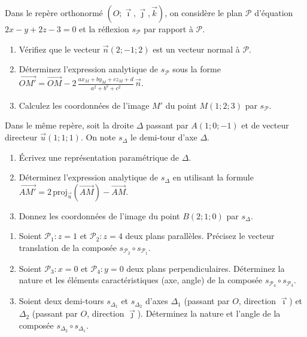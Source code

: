 \documentclass[11pt]{article}
\begin{document}
\begin{exercice}
Dans le repère orthonormé $(O;\vec{\imath},\vec{\jmath},\vec{k})$, on considère le plan $\mathcal{P}$ d'équation $2x - y + 2z - 3 = 0$ et la réflexion $s_{\mathcal{P}}$ par rapport à $\mathcal{P}$.
\begin{enumerate}
    \item Vérifiez que le vecteur $\vec{n}(2;-1;2)$ est un vecteur normal à $\mathcal{P}$.
    \item Déterminez l'expression analytique de $s_{\mathcal{P}}$ sous la forme $\overrightarrow{OM'} = \overrightarrow{OM} - 2\,\frac{ax_M+by_M+cz_M+d}{a^2+b^2+c^2}\,\vec{n}$.
    \item Calculez les coordonnées de l'image $M'$ du point $M(1;2;3)$ par $s_{\mathcal{P}}$.
\end{enumerate}
\end{exercice}

\begin{exercice}
Dans le même repère, soit la droite $\Delta$ passant par $A(1;0;-1)$ et de vecteur directeur $\vec{u}(1;1;1)$. On note $s_{\Delta}$ le demi-tour d'axe $\Delta$.
\begin{enumerate}
    \item Écrivez une représentation paramétrique de $\Delta$.
    \item Déterminez l'expression analytique de $s_{\Delta}$ en utilisant la formule $\overrightarrow{AM'} = 2\,\text{proj}_{\vec{u}}(\overrightarrow{AM}) - \overrightarrow{AM}$.
    \item Donnez les coordonnées de l'image du point $B(2;1;0)$ par $s_{\Delta}$.
\end{enumerate}
\end{exercice}

\begin{exercice}
\begin{enumerate}
    \item Soient $\mathcal{P}_1 : z=1$ et $\mathcal{P}_2 : z=4$ deux plans parallèles. Précisez le vecteur translation de la composée $s_{\mathcal{P}_2} \circ s_{\mathcal{P}_1}$.
    \item Soient $\mathcal{P}_3 : x=0$ et $\mathcal{P}_4 : y=0$ deux plans perpendiculaires. Déterminez la nature et les éléments caractéristiques (axe, angle) de la composée $s_{\mathcal{P}_4} \circ s_{\mathcal{P}_3}$.
    \item Soient deux demi-tours $s_{\Delta_1}$ et $s_{\Delta_2}$ d'axes $\Delta_1$ (passant par $O$, direction $\vec{\imath}$) et $\Delta_2$ (passant par $O$, direction $\vec{\jmath}$). Déterminez la nature et l'angle de la composée $s_{\Delta_2} \circ s_{\Delta_1}$.
\end{enumerate}
\end{exercice}
\end{document}
